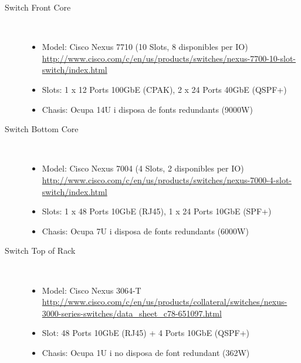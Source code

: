 \begin{description}
    \item[Switch Front Core] \hfill \\
        \vspace{-5mm}
        \begin{itemize}[leftmargin=*]
            \item Model: Cisco Nexus 7710 (10 Slots, 8 disponibles per IO) 
            \\\url{http://www.cisco.com/c/en/us/products/switches/nexus-7700-10-slot-switch/index.html}
            \item Slots: 1 x 12 Ports 100GbE (CPAK), 2 x 24 Ports 40GbE (QSPF+) 
            \item Chasis: Ocupa 14U i disposa de fonts redundants (9000W)
        \end{itemize}
        
    \item[Switch Bottom Core] \hfill \\
        \vspace{-5mm}
        \begin{itemize}[leftmargin=*]
            \item Model: Cisco Nexus 7004 (4 Slots, 2 disponibles per IO) 
            \\\url{http://www.cisco.com/c/en/us/products/switches/nexus-7000-4-slot-switch/index.html}
            \item Slots: 1 x 48 Ports 10GbE (RJ45), 1 x 24 Ports 10GbE (SPF+) 
            \item Chasis: Ocupa 7U i disposa de fonts redundants (6000W)
        \end{itemize}
        
    \item[Switch Top of Rack] \hfill \\
        \vspace{-5mm}
        \begin{itemize}[leftmargin=*]
            \item Model: Cisco Nexus 3064-T
            \\\url{http://www.cisco.com/c/en/us/products/collateral/switches/nexus-3000-series-switches/data\_sheet\_c78-651097.html}
            \item Slot: 48 Ports 10GbE (RJ45) + 4 Ports 10GbE (QSPF+) 
            \item Chasis: Ocupa 1U i no disposa de font redundant (362W)
        \end{itemize}

\end{description}


